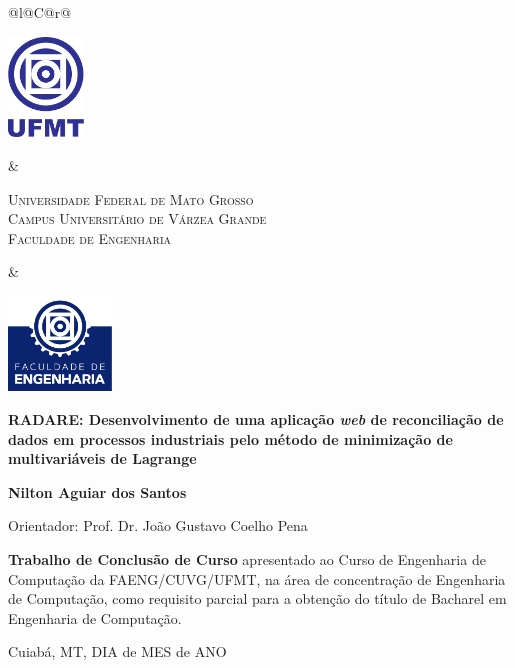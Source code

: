 \begin{titlepage}

\begin{center}

\small

\begin{tabularx}{\linewidth}{@{}l@{}C@{}r@{}}
\parbox[c]{2cm}{\includegraphics[width=2cm]{pre-textuais/figuras/ufmt}} &
\begin{center}
\textsf{\textsc{Universidade Federal de Mato Grosso\\
Campus Universitário de Várzea Grande\\
Faculdade de Engenharia}}
\end{center} &
\parbox[c]{2cm}{\includegraphics[width=2.75cm]{pre-textuais/figuras/faeng}}
\end{tabularx}

\vfill

\LARGE

\textbf{RADARE: Desenvolvimento de uma aplicação \textit{web} de reconciliação de dados em processos industriais pelo método de minimização de multivariáveis de Lagrange}

\vfill

\Large

\textbf{Nilton Aguiar dos Santos}

\vfill

\normalsize

Orientador: Prof. Dr. João Gustavo Coelho Pena

\vfill

\hfill
\parbox{0.5\linewidth}{\textbf{Trabalho de Conclusão de Curso}
apresentado ao Curso de Engenharia de Computação da FAENG/CUVG/UFMT,
na área de concentração de Engenharia de Computação,
como requisito parcial para a obtenção do título de Bacharel
em Engenharia de Computação.}

\vfill

\large

Cuiabá, MT, DIA de MES de ANO

\end{center}

\end{titlepage}
